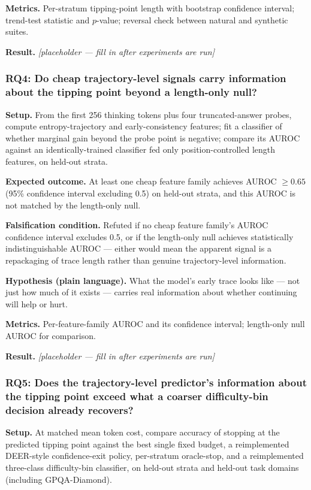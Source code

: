 \documentclass[11pt]{article}
\newcommand{\ph}{\textit{[placeholder --- fill in after experiments are run]}}
\begin{document}
\textbf{Metrics.} Per-stratum tipping-point length with bootstrap confidence interval; trend-test statistic and $p$-value; reversal check between natural and synthetic suites.

\textbf{Result.} \ph

\subsubsection{RQ4: Do cheap trajectory-level signals carry information about the tipping point beyond a length-only null?}
\textbf{Setup.} From the first 256 thinking tokens plus four truncated-answer probes, compute entropy-trajectory and early-consistency features; fit a classifier of whether marginal gain beyond the probe point is negative; compare its AUROC against an identically-trained classifier fed only position-controlled length features, on held-out strata.

\textbf{Expected outcome.} At least one cheap feature family achieves AUROC $\geq 0.65$ (95\% confidence interval excluding 0.5) on held-out strata, and this AUROC is not matched by the length-only null.

\textbf{Falsification condition.} Refuted if no cheap feature family's AUROC confidence interval excludes 0.5, or if the length-only null achieves statistically indistinguishable AUROC --- either would mean the apparent signal is a repackaging of trace length rather than genuine trajectory-level information.

\textbf{Hypothesis (plain language).} What the model's early trace looks like --- not just how much of it exists --- carries real information about whether continuing will help or hurt.

\textbf{Metrics.} Per-feature-family AUROC and its confidence interval; length-only null AUROC for comparison.

\textbf{Result.} \ph

\subsubsection{RQ5: Does the trajectory-level predictor's information about the tipping point exceed what a coarser difficulty-bin decision already recovers?}
\textbf{Setup.} At matched mean token cost, compare accuracy of stopping at the predicted tipping point against the best single fixed budget, a reimplemented DEER-style confidence-exit policy, per-stratum oracle-stop, and a reimplemented three-class difficulty-bin classifier, on held-out strata and held-out task domains (including GPQA-Diamond).
\end{document}
